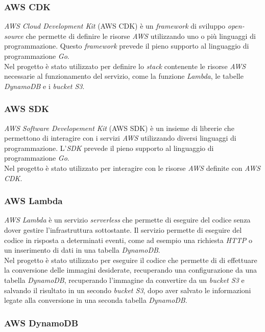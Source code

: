 \subsubsection*{AWS CDK}

\emph{AWS Cloud Development Kit} (AWS CDK) è un \emph{framework} di sviluppo
\emph{open-source} che permette di definire le risorse \emph{AWS} utilizzando
uno o più linguaggi di programmazione. Questo \emph{framework} prevede il pieno
supporto al linguaggio di programmazione \emph{Go}. \\
Nel progetto è stato utilizzato per definire lo \emph{stack} contenente le risorse \emph{AWS}
necessarie al funzionamento del servizio, come la funzione \emph{Lambda}, le
tabelle \emph{DynamoDB} e i \emph{bucket S3}. \cite{go-aws-cdk}

\subsubsection*{AWS SDK}

\emph{AWS Software Developement Kit} (AWS SDK) è un insieme di librerie che
permettono di interagire con i servizi \emph{AWS} utilizzando diversi linguaggi
di programmazione. L'\emph{SDK} prevede il pieno supporto al linguaggio di
programmazione \emph{Go}. \\
Nel progetto è stato utilizzato per interagire con le risorse \emph{AWS}
definite con \emph{AWS CDK}. \cite{go-aws-sdk}

\subsubsection*{AWS Lambda}

\emph{AWS Lambda} è un servizio \emph{serverless} che permette di eseguire del
codice senza dover gestire l'infrastruttura sottostante. Il servizio permette di
eseguire del codice in risposta a determinati eventi, come ad esempio una
richiesta \emph{HTTP} o un inserimento di dati in una tabella \emph{DynamoDB}.
\\
Nel progetto è stato utilizzato per eseguire il codice che permette di
di effettuare la conversione delle immagini desiderate, recuperando una
configurazione da una tabella \emph{DynamoDB}, recuperando l'immagine da
convertire da un \emph{bucket S3} e salvando il risultato in un secondo
\emph{bucket S3}, dopo aver salvato le informazioni legate alla conversione in
una seconda tabella \emph{DynamoDB}.

\subsubsection*{AWS DynamoDB}

